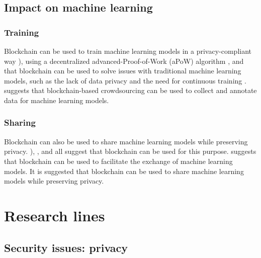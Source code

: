 \documentclass{article}
\begin{document}
\subsection{Impact on machine learning}

\subsubsection{Training}
Blockchain can be used to train machine learning models in a privacy-compliant way \cite{ladia_2019}), using a decentralized advanced-Proof-of-Work (aPoW) algorithm \cite{kusi_2020}, and that blockchain can be used to solve issues with traditional machine learning models, such as the lack of data privacy and the need for continuous training \cite{ding_2022}. \cite{xu_2022} suggests that blockchain-based crowdsourcing can be used to collect and annotate data for machine learning models.

\subsubsection{Sharing}
Blockchain can also be used to share machine learning models while preserving privacy. \cite{ladia_2019}), \cite{lu_2020}, and \cite{lee_2021} all suggest that blockchain can be used for this purpose. \cite{kurtulmus_2018} suggests that blockchain can be used to facilitate the exchange of machine learning models. It is suggested that blockchain can be used to share machine learning models while preserving privacy.

\section{Research lines}

\subsection{Security issues: privacy}
\end{document}
